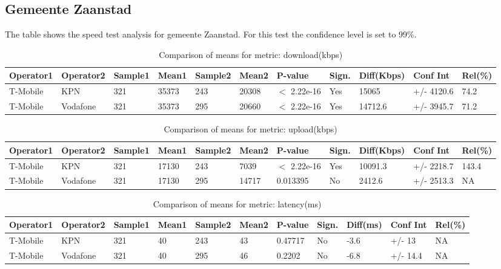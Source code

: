 \documentclass[]{article}
\begin{document}
\normalsize

\newpage

\subsection{Gemeente Zaanstad}\label{gemeente-zaanstad}

The table shows the speed test analysis for gemeente Zaanstad. For this
test the confidence level is set to 99\%.

\begin{table}[ht]
\centering
{\footnotesize
\begin{tabular}{lllllllllll}
  \hline
Operator1 & Operator2 & Sample1 & Mean1 & Sample2 & Mean2 & P-value & Sign. & Diff(Kbps) & Conf Int & Rel(\%) \\ 
  \hline
T-Mobile & KPN & 321 & 35373 & 243 & 20308 & $<$ 2.22e-16 & Yes & 15065 & +/- 4120.6 & 74.2 \\ 
  T-Mobile & Vodafone & 321 & 35373 & 295 & 20660 & $<$ 2.22e-16 & Yes & 14712.6 & +/- 3945.7 & 71.2 \\ 
   \hline
\end{tabular}
}
\caption{Comparison of means for metric: download(kbps)} 
\end{table}

\begin{table}[ht]
\centering
{\footnotesize
\begin{tabular}{lllllllllll}
  \hline
Operator1 & Operator2 & Sample1 & Mean1 & Sample2 & Mean2 & P-value & Sign. & Diff(Kbps) & Conf Int & Rel(\%) \\ 
  \hline
T-Mobile & KPN & 321 & 17130 & 243 & 7039 & $<$ 2.22e-16 & Yes & 10091.3 & +/- 2218.7 & 143.4 \\ 
  T-Mobile & Vodafone & 321 & 17130 & 295 & 14717 & 0.013395 & No & 2412.6 & +/- 2513.3 & NA \\ 
   \hline
\end{tabular}
}
\caption{Comparison of means for metric: upload(kbps)} 
\end{table}

\begin{table}[ht]
\centering
{\footnotesize
\begin{tabular}{lllllllllll}
  \hline
Operator1 & Operator2 & Sample1 & Mean1 & Sample2 & Mean2 & P-value & Sign. & Diff(ms) & Conf Int & Rel(\%) \\ 
  \hline
T-Mobile & KPN & 321 & 40 & 243 & 43 & 0.47717 & No & -3.6 & +/- 13 & NA \\ 
  T-Mobile & Vodafone & 321 & 40 & 295 & 46 & 0.2202 & No & -6.8 & +/- 14.4 & NA \\ 
   \hline
\end{tabular}
}
\caption{Comparison of means for metric: latency(ms)} 
\end{table}
\end{document}
